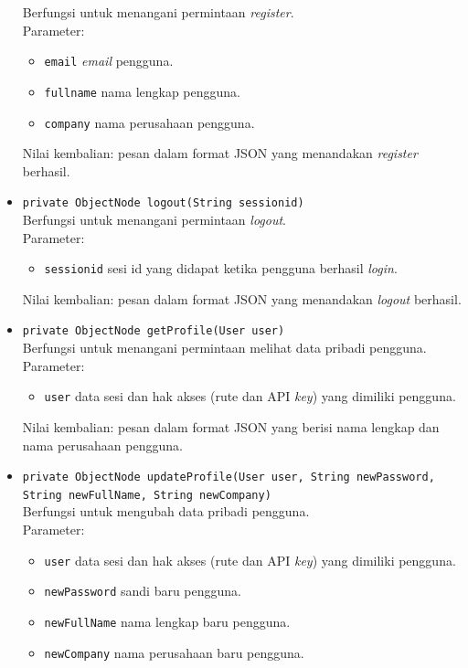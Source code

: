 \begin{itemize}
	Berfungsi untuk menangani permintaan \textit{register}.\\
	Parameter:
	\begin{itemize}
		\item \texttt{email} \textit{email} pengguna.
		\item \texttt{fullname} nama lengkap pengguna.
		\item \texttt{company} nama perusahaan pengguna.
	\end{itemize}
	Nilai kembalian: pesan dalam format JSON yang menandakan \textit{register} berhasil.
	\item \texttt{private ObjectNode logout(String sessionid)}\\
	Berfungsi untuk menangani permintaan \textit{logout}.\\
	Parameter:
	\begin{itemize}
		\item \texttt{sessionid} sesi id yang didapat ketika pengguna berhasil \textit{login}.
	\end{itemize}
	Nilai kembalian: pesan dalam format JSON yang menandakan \textit{logout} berhasil.
	\item \texttt{private ObjectNode getProfile(User user)}\\
	Berfungsi untuk menangani permintaan melihat data pribadi pengguna.\\
	Parameter:
	\begin{itemize}
		\item \texttt{user} data sesi dan hak akses (rute dan API \textit{key}) yang dimiliki pengguna.
	\end{itemize}
	Nilai kembalian: pesan dalam format JSON yang berisi nama lengkap dan nama perusahaan pengguna.
	\item \texttt{private ObjectNode updateProfile(User user, String newPassword, String newFullName, String newCompany)}\\
	Berfungsi untuk mengubah data pribadi pengguna.\\
	Parameter:
	\begin{itemize}
		\item \texttt{user} data sesi dan hak akses (rute dan API \textit{key}) yang dimiliki pengguna.
		\item \texttt{newPassword} sandi baru pengguna.
		\item \texttt{newFullName} nama lengkap baru pengguna.
		\item \texttt{newCompany} nama perusahaan baru pengguna.
	\end{itemize}

\end{itemize}
